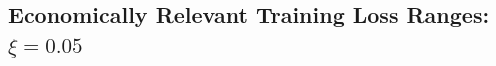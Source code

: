 \documentclass[12pt]{article}
\begin{document}
\begin{appendices}
        






\newpage
\clearpage

\subsection{Economically Relevant Training Loss Ranges: $\xi = 0.05$}

 






\end{appendices}
\end{document}
